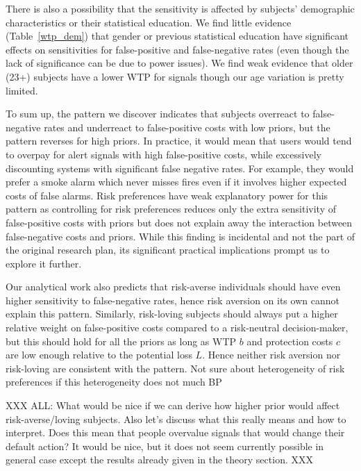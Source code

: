 \documentclass[12pt,a4paper]{article}
\newcommand{\agt}[1]{{\color{OliveGreen}#1}}
\newcommand{\aut}[1]{{\color{Red}#1}}
\begin{document}
There is also a possibility that the sensitivity is affected by subjects' demographic characteristics or their statistical education. We find little evidence (Table~\ref{wtp_dem}) that gender or previous statistical education have significant effects on sensitivities for false-positive and false-negative rates (even though the lack of significance can be due to power issues). We find weak evidence that older (23+) subjects have a lower WTP for signals though our age variation is pretty limited.

To sum up, the pattern we discover indicates that subjects overreact to false-negative rates and underreact to false-positive costs with low priors, but the pattern reverses for high priors. In practice, it would mean that users would tend to overpay for alert signals with high false-positive costs, while excessively discounting systems with significant false negative rates. For example, they would prefer a smoke alarm which never misses fires even if it involves higher expected costs of false alarms. Risk preferences have weak explanatory power for this pattern as controlling for risk preferences reduces only the extra sensitivity of false-positive costs with priors but does not explain away the interaction between false-negative costs and priors. While this finding is incidental and not the part of the original research plan, its significant practical implications prompt us to explore it further.

Our analytical work also predicts that risk-averse individuals should have even higher sensitivity to false-negative rates, hence risk aversion on its own cannot explain this pattern. Similarly, risk-loving subjects should always put a higher relative weight on false-positive costs compared to a risk-neutral decision-maker, but this should hold for all the priors as long as WTP $b$ and protection costs $c$ are low enough relative to the potential loss $L$. Hence neither risk aversion nor risk-loving are consistent with the pattern. \aut{Not sure about heterogeneity of risk preferences if this heterogeneity does not much BP}

XXX \agt{ALL: What would be nice if we can derive how higher prior would affect risk-averse/loving subjects. Also let's discuss what this really means and how to interpret. Does this mean that people overvalue signals that would change their default action?} \aut{It would be nice, but it does not seem currently possible in general case except the results already given in the theory section.} XXX
\end{document}
